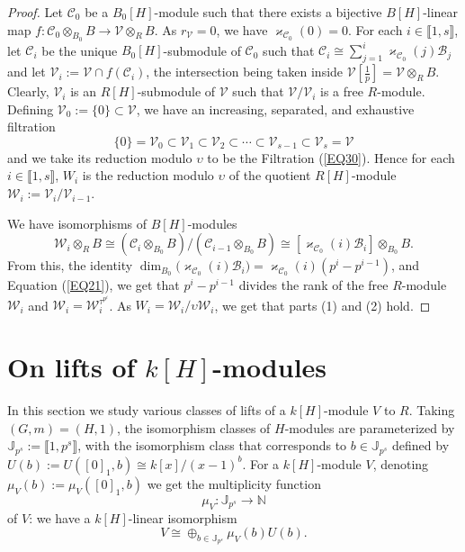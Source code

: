 \documentclass[11pt]{amsart}
\begin{document}
\begin{proof}
Let $\mathcal C_0$ be a $B_0[H]$-module such that there exists a bijective $B[H]$-linear map $f:\mathcal C_0\otimes_{B_0} B\rightarrow \mathcal V\otimes_R B$. As $r_{\mathcal V}=0$, we have $\varkappa_{\mathcal C_0}(0)=0$. For each $i\in\llbracket1,s\rrbracket$, let $\mathcal C_i$ be the unique $B_0[H]$-submodule of $\mathcal C_0$ such that $\mathcal C_i\cong\sum_{j=1}^i \varkappa_{\mathcal C_0}(j)\mathcal B_j$ and let $\mathcal V_i:=\mathcal V\cap f(\mathcal C_i)$, the intersection being taken inside $\mathcal V[\frac{1}{p}]=\mathcal V\otimes_R B$. Clearly, $\mathcal V_i$ is an $R[H]$-submodule of $\mathcal V$ such that $\mathcal V/\mathcal V_i$ is a free $R$-module. Defining $\mathcal V_0:=\{0\}\subset\mathcal V$, we have an increasing, separated, and exhaustive filtration
$$\{0\}=\mathcal V_0\subset\mathcal V_1\subset\mathcal V_2\subset\cdots\subset\mathcal V_{s-1}\subset\mathcal V_s=\mathcal V$$
and we take its reduction modulo $\upsilon$ to be the Filtration (\ref{EQ30}). Hence for each $i\in\llbracket1,s\rrbracket$, $W_i$ is the reduction modulo $\upsilon$ of the quotient $R[H]$-module $\mathcal W_i:=\mathcal V_i/\mathcal V_{i-1}$. 

We have isomorphisms of $B[H]$-modules
$$\mathcal W_i\otimes_R B\cong (\mathcal C_i\otimes_{B_0} B)/(\mathcal C_{i-1}\otimes_{B_0} B)\cong [\varkappa_{\mathcal C_0}(i)\mathcal B_i]\otimes_{B_0} B.$$
 From this, the identity $\dim_{B_0}\bigl(\varkappa_{\mathcal C_0}(i)\mathcal B_i\bigr)=\varkappa_{\mathcal C_0}(i)(p^i-p^{i-1})$, and Equation (\ref{EQ21}), we get that $p^i-p^{i-1}$ divides the rank of the free $R$-module $\mathcal W_i$ and $\mathcal W_i=\mathcal W_i^{\tau^{p^i}}$. As $W_i=\mathcal W_i/\upsilon\mathcal W_i$, we get that parts (1) and (2) hold.\end{proof}

\section{On  lifts of $k[H]$-modules}\label{S4}

In this section we study various classes of lifts of a $k[H]$-module $V$ to $R$. Taking $(G,m)=(H,1)$, the isomorphism classes of $H$-modules are parameterized by $\mathbb J_{p^s}:=\llbracket1,p^s\rrbracket$, with the isomorphism class that corresponds to $b\in\mathbb J_{p^s}$ defined by $U(b):=U([0]_1,b)\cong k[x]/(x-1)^b$. For a $k[H]$-module $V$, denoting $\mu_V(b):=\mu_V([0]_1,b)$ we get the multiplicity function 
$$\mu_V:\mathbb J_{p^s}\rightarrow\mathbb N$$ 
of $V$: we have a $k[H]$-linear isomorphism
$$V\cong\oplus_{b\in\mathbb J_{p^s}} \mu_V(b)U(b).$$
\end{document}

